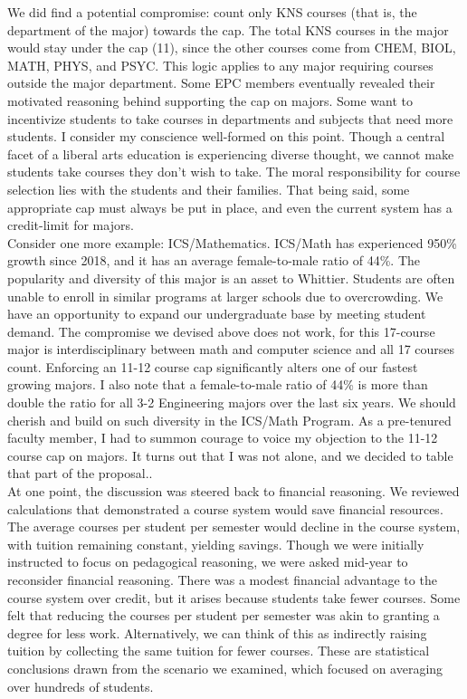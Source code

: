 \documentclass[../../../main.tex]{subfiles}
\begin{document}
We did find a potential compromise: count only KNS courses (that is, the department of the major) towards the cap.  The total KNS courses in the major would stay under the cap (11), since the other courses come from CHEM, BIOL, MATH, PHYS, and PSYC.  This logic applies to any major requiring courses outside the major department.  Some EPC members eventually revealed their motivated reasoning behind supporting the cap on majors.  Some want to incentivize students to take courses in departments and subjects that need more students.  I consider my conscience well-formed on this point.  Though a central facet of a liberal arts education is experiencing diverse thought, we cannot make students take courses they don't wish to take.  The moral responsibility for course selection lies with the students and their families.  That being said, some appropriate cap must always be put in place, and even the current system has a credit-limit for majors.
\\
\vspace{0.15cm}
Consider one more example: ICS/Mathematics.  ICS/Math has experienced 950\% growth since 2018, and it has an average female-to-male ratio of 44\%.  The popularity and diversity of this major is an asset to Whittier.  Students are often unable to enroll in similar programs at larger schools due to overcrowding.  We have an opportunity to expand our undergraduate base by meeting student demand.  The compromise we devised above does not work, for this 17-course major is interdisciplinary between math and computer science and all 17 courses count.  Enforcing an 11-12 course cap significantly alters one of our fastest growing majors.  I also note that a female-to-male ratio of 44\% is more than double the ratio for all 3-2 Engineering majors over the last six years.  We should cherish and build on such diversity in the ICS/Math Program.  As a pre-tenured faculty member, I had to summon courage to voice my objection to the 11-12 course cap on majors.  It turns out that I was not alone, and we decided to table that part of the proposal..
\\
\vspace{0.15cm}
At one point, the discussion was steered back to financial reasoning.  We reviewed calculations that demonstrated a course system would save financial resources.  The average courses per student per semester would decline in the course system, with tuition remaining constant, yielding savings.  Though we were initially instructed to focus on pedagogical reasoning, we were asked mid-year to reconsider financial reasoning.  There was a modest financial advantage to the course system over credit, but it arises because students take fewer courses.  Some felt that reducing the courses per student per semester was akin to granting a degree for less work.  Alternatively, we can think of this as indirectly raising tuition by collecting the same tuition for fewer courses.  These are statistical conclusions drawn from the scenario we examined, which focused on averaging over hundreds of students.
\end{document}
